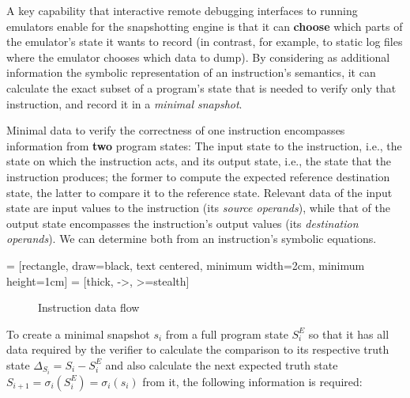 A key capability that interactive remote debugging interfaces to running emulators enable for the snapshotting engine is
that it can \textbf{choose} which parts of the emulator's state it wants to record (in contrast, for example, to static
log files where the emulator chooses which data to dump). By considering as additional information the symbolic
representation of an instruction's semantics, it can calculate the exact subset of a program's state that is needed to
verify only that instruction, and record it in a \textit{minimal snapshot}.

Minimal data to verify the correctness of one instruction encompasses information from \textbf{two} program states: The
input state to the instruction, i.e., the state on which the instruction acts, and its output state, i.e., the state
that the instruction produces; the former to compute the expected reference destination state, the latter to compare it
to the reference state. Relevant data of the input state are input values to the instruction (its \textit{source
operands}), while that of the output state encompasses the instruction's output values (its \textit{destination
operands}). We can determine both from an instruction's symbolic equations.

 = [rectangle, draw=black, text centered, minimum width=2cm, minimum height=1cm]
 = [thick, ->, >=stealth]

\begin{figure}[htpb]
\begin{center}
\end{center}
\caption{Instruction data flow}%
\label{fig:instr_data_flow}
\end{figure}

To create a minimal snapshot $s_i$ from a full program state $S^E_i$ so that it has all data required by the verifier to
calculate the comparison to its respective truth state $\Delta_{S_i} = S_i - S^E_i$ and also calculate the next expected
truth state $S_{i+1} = \sigma_i(S^E_i) = \sigma_i(s_i)$ from it, the following information is required:

